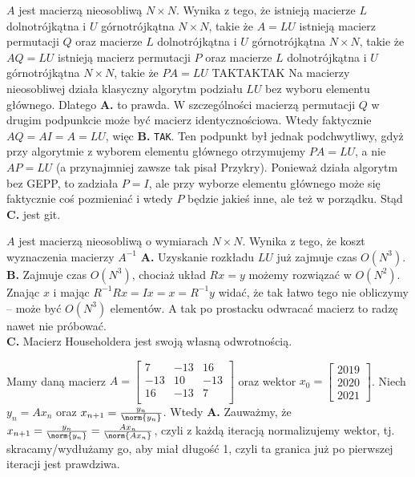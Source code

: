 \begin{solutions}
    \sol $A$ jest macierzą nieosobliwą $N \times N$. Wynika z tego, że
    \answerss
    {istnieją macierze $L$ dolnotrójkątna i $U$ górnotrójkątna $N \times N$, takie że $A = LU$}
    {istnieją macierz permutacji $Q$ oraz macierze $L$ dolnotrójkątna i $U$ górnotrójkątna $N \times N$, takie że $AQ = LU$}
    {istnieją macierz permutacji $P$ oraz macierze $L$ dolnotrójkątna i $U$ górnotrójkątna $N \times N$, takie że $PA = LU$}
    {TAK}{TAK}{TAK}
    Na macierzy nieosobliwej działa klasyczny algorytm podziału $LU$ bez wyboru elementu głównego. Dlatego \textbf{A.} to prawda. W szczególności macierzą permutacji $Q$ w drugim podpunkcie może być macierz identycznościowa. Wtedy faktycznie $AQ=AI=A=LU$, więc \textbf{B.} \texttt{TAK}. Ten podpunkt był jednak podchwytliwy, gdyż przy algorytmie z wyborem elementu głównego otrzymujemy $PA=LU$, a nie $AP=LU$ (a przynajmniej zawsze tak pisał Przykry). Ponieważ działa algorytm bez GEPP, to zadziała $P=I$, ale przy wyborze elementu głównego może się faktycznie coś pozmieniać i wtedy $P$ będzie jakieś inne, ale też w porządku. Stąd \textbf{C.} jest git.
    
    \sol $A$ jest macierzą nieosobliwą o wymiarach $N\times N$. Wynika z tego, że koszt wyznaczenia macierzy $A^{-1}$
    \textbf{A.} Uzyskanie rozkładu $LU$ już zajmuje czas $O(N^3)$. \\
    \textbf{B.} Zajmuje czas $O(N^3)$, chociaż układ $Rx=y$ możemy rozwiązać w $O(N^2)$. Znając $x$ i mając $R^{-1}Rx=Ix=x=R^{-1}y$ widać, że tak łatwo tego nie obliczymy -- może być $O(N^3)$ elementów. A tak po prostacku odwracać macierz to radzę nawet nie próbować. \\
    \textbf{C.} Macierz Householdera jest swoją własną odwrotnością.

    \sol Mamy daną macierz $A = \begin{bmatrix}
        7 & -13 & 16\\
        -13 & 10 & -13\\
        16 & -13 & 7 \\
    \end{bmatrix}$
    oraz wektor $x_0 = \begin{bmatrix}
        2019 \\
        2020 \\
        2021 
    \end{bmatrix}$. Niech $y_n = A x_{n}$ oraz $ x_{n+1} = \frac{y_{n}}{\norm{y_{n}}}$. Wtedy
    \textbf{A.} Zauważmy, że $x_{n+1}=\frac{y_n}{\norm{y_n}}=\frac{Ax_n}{\norm{Ax_n}}$, czyli z każdą iteracją normalizujemy wektor, tj. skracamy/wydłużamy go, aby miał długość 1, czyli ta granica już po pierwszej iteracji jest prawdziwa.


\end{solutions}
